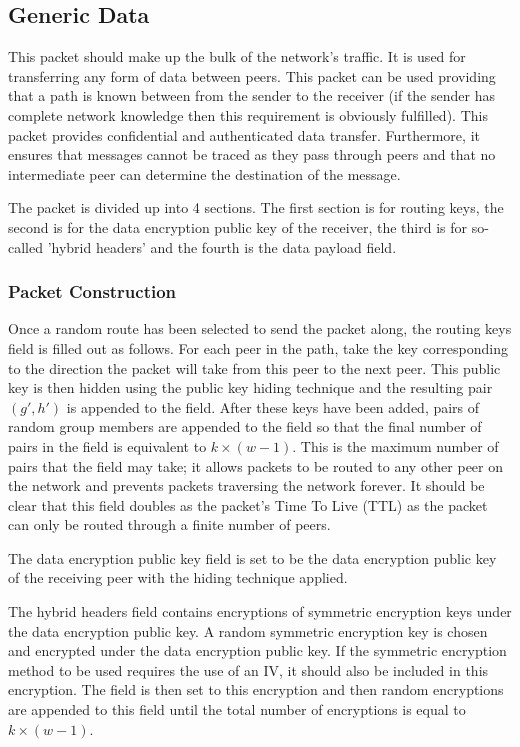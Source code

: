 \documentclass[ %
                    author={Luke Murray},
                supervisor={Dr. Simon Hollis},
                     title={Shadow Peer-to-Peer Networks},
                  subtitle={},
                    degree={MEng},
                      year={2013} ]{thesis}
\begin{document}
\subsection{Generic Data}

This packet should make up the bulk of the network's traffic. It is used for transferring any form of data between peers. This packet can be used providing that a path is known between from the sender to the receiver (if the sender has complete network knowledge then this requirement is obviously fulfilled). This packet provides confidential and authenticated data transfer. Furthermore, it ensures that messages cannot be traced as they pass through peers and that no intermediate peer can determine the destination of the message.

The packet is divided up into 4 sections. The first section is for routing keys, the second is for the data encryption public key of the receiver, the third is for so-called 'hybrid headers' and the fourth is the data payload field.

\subsubsection{Packet Construction}

Once a random route has been selected to send the packet along, the routing keys field is filled out as follows. For each peer in the path, take the key corresponding to the direction the packet will take from this peer to the next peer. This public key is then hidden using the public key hiding technique and the resulting pair $(g\prime, h\prime)$ is appended to the field. After these keys have been added, pairs of random group members are appended to the field so that the final number of pairs in the field is equivalent to $k \times (w - 1)$. This is the maximum number of pairs that the field may take; it allows packets to be routed to any other peer on the network and prevents packets traversing the network forever. It should be clear that this field doubles as the packet's Time To Live (TTL) as the packet can only be routed through a finite number of peers.

The data encryption public key field is set to be the data encryption public key of the receiving peer with the hiding technique applied.

The hybrid headers field contains encryptions of symmetric encryption keys under the data encryption public key. A random symmetric encryption key is chosen and encrypted under the data encryption public key. If the symmetric encryption method to be used requires the use of an IV, it should also be included in this encryption. The field is then set to this encryption and then random encryptions are appended to this field until the total number of encryptions is equal to $k \times (w - 1)$.
\end{document}
